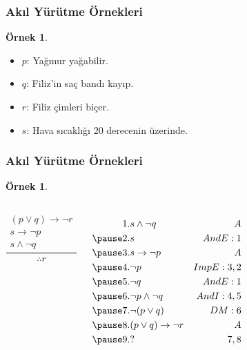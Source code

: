 \documentclass[dvipsnames]{beamer}
\theoremstyle{definition}
\theoremstyle{example}
\newtheorem{ornek}[theorem]{Örnek}
\theoremstyle{plain}
\begin{document}
\begin{frame}
  \frametitle{Akıl Yürütme Örnekleri}

  \begin{ornek}
    \begin{itemize}
      \item $p$: Yağmur yağabilir.
      \item $q$: Filiz'in saç bandı kayıp.
      \item $r$: Filiz çimleri biçer.
      \item $s$: Hava sıcaklığı 20 derecenin üzerinde.
    \end{itemize}
  \end{ornek}
\end{frame}

\begin{frame}
  \frametitle{Akıl Yürütme Örnekleri}

  \begin{ornek}
    \begin{columns}
      \[
      \frac
        {
          \begin{array}{c}
            (p \vee q) \rightarrow \neg r\\
            s \rightarrow \neg p\\
            s \wedge \neg q
          \end{array}
        }
        {
          \therefore r
        }
      \]

      \pause
      \begin{eqnarray*}
        1. & s \wedge \neg q                & A\\
        \pause
        2. & s                              & AndE:1\\
        \pause
        3. & s \rightarrow \neg p           & A\\
        \pause
        4. & \neg p                         & ImpE:3,2\\
        \pause
        5. & \neg q                         & AndE:1\\
        \pause
        6. & \neg p \wedge \neg q           & AndI:4,5\\
        \pause
        7. & \neg (p \vee q)                & DM:6\\
        \pause
        8. & (p \vee q) \rightarrow \neg r  & A\\
        \pause
        9. & ?                              & 7,8
      \end{eqnarray*}
    \end{columns}
  \end{ornek}
\end{frame}
\end{document}
